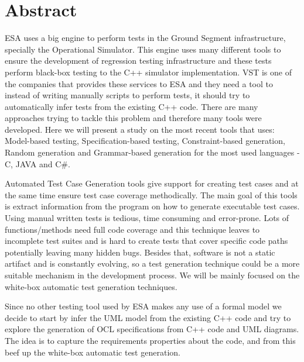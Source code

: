 \cleardoublepage
\chapter*{Abstract}
\ac{ESA} uses a big engine to perform tests in the
Ground Segment infrastructure, specially the Operational Simulator.
This engine uses many different tools to ensure the development of
regression testing infrastructure and these tests perform black-box
testing to the C++ simulator implementation.
\ac{VST} is one of the companies that provides
these services to \ac{ESA} and they need a tool to instead of writing
manually scripts to perform tests, it should try to automatically
infer tests from the existing C++ code.
There are many approaches trying to tackle this problem and therefore
many tools were developed. Here we will present a study on the most
recent tools that uses: Model-based testing, Specification-based
testing, Constraint-based generation, Random generation and
Grammar-based generation for the most used languages - C, JAVA and C\#.

Automated Test Case Generation tools give support for creating test
cases and at the same time ensure test case coverage methodically. The
main goal of this tools is extract information from the program on how
to generate executable test cases.
Using manual written tests is tedious, time consuming and error-prone.
Lots of functions/methods need full code coverage and this technique
leaves to incomplete test suites and is hard to create tests that
cover specific code paths potentially leaving many hidden bugs.
Besides that, software is not a static artifact and is constantly
evolving, so a test generation technique could be a more suitable
mechanism in the development process.
We will be mainly focused on the white-box automatic test generation techniques.

Since no other testing tool used by \ac{ESA} makes any use of a formal
model we decide to start by infer the \ac{UML} model from the existing C++
code and try to explore the generation of \ac{OCL} specifications
from C++ code and \ac{UML} diagrams. The idea is to capture the requirements properties about the code, and from this beef up the white-box automatic test generation.

